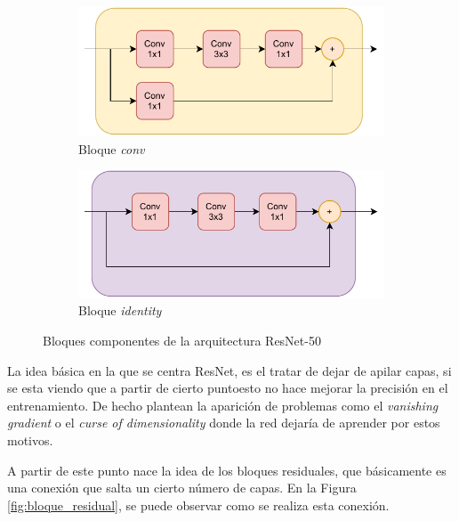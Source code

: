 \begin{itemize}
    \begin{figure}[h]
    \centering
    \begin{subfigure}{0.55\textwidth}
        \centering
        \includegraphics[width=\textwidth]{figuras/desarrollo teorico/desarrollo_teorico-ResNet 50-conv.pdf} 
        \caption{Bloque \textit{conv}}
        \label{fig:conv_bloque}
    \end{subfigure}
    \hfill
    \begin{subfigure}{0.55\textwidth}
        \centering
        \includegraphics[width=\textwidth]{figuras/desarrollo teorico/desarrollo_teorico-ResNet 50-identity.pdf} 
        \caption{Bloque \textit{identity}}
        \label{fig:identity_bloque}
    \end{subfigure}
    \caption{Bloques componentes de la arquitectura ResNet-50}
    \label{fig:bloques_resnet50}
    \end{figure}

    
    La idea básica en la que se centra ResNet, es el tratar de dejar de apilar capas, si se esta viendo que a partir de cierto puntoesto no hace mejorar la precisión en el entrenamiento. De hecho plantean la aparición de problemas como el \textit{vanishing gradient} o el \textit{curse of dimensionality} donde la red dejaría de aprender por estos motivos.
    
    A partir de este punto nace la idea de los bloques residuales, que básicamente es una conexión que salta un cierto número de capas. En la Figura \ref{fig:bloque_residual}, se puede observar como se realiza esta conexión.
    

\end{itemize}
